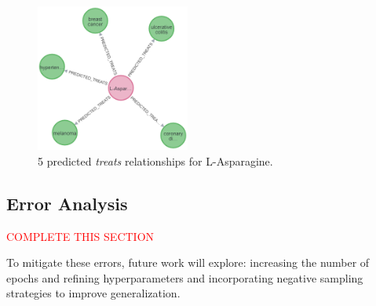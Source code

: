 \begin{figure}[ht]
    \centering
    \includegraphics[width=0.45\textwidth]{images/pykeen/predicted treats.png}
    \caption{5 predicted \textit{treats} relationships for L-Asparagine.}
    \label{fig:predicted_treats}
\end{figure}

\subsection*{Error Analysis}

\textcolor{red}{COMPLETE THIS SECTION}

To mitigate these errors, future work will explore: increasing the number of epochs and refining hyperparameters and incorporating negative sampling strategies to improve generalization.
